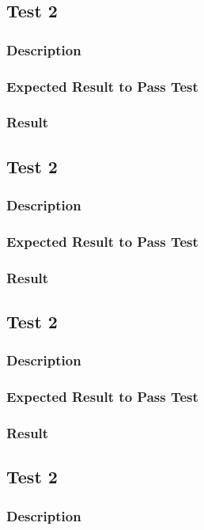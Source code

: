 \documentclass[11pt]{article}
\begin{document}
\subsection{Test 2}
\subsubsection{Description}
\subsubsection{Expected Result to Pass Test}
\subsubsection{Result}

\subsection{Test 2}
\subsubsection{Description}
\subsubsection{Expected Result to Pass Test}
\subsubsection{Result}

\subsection{Test 2}
\subsubsection{Description}
\subsubsection{Expected Result to Pass Test}
\subsubsection{Result}

\subsection{Test 2}
\subsubsection{Description}
\end{document}
